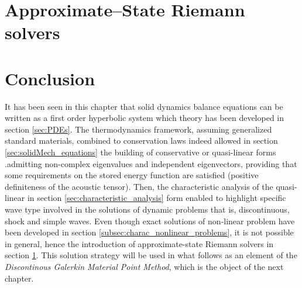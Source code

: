 \section{Approximate--State Riemann solvers}
\label{sec:riemann_solvers}


\section*{Conclusion}
It has been seen in this chapter that solid dynamics balance equations can be written as a first order hyperbolic system which theory has been developed in section \ref{sec:PDEs}. The thermodynamics framework, assuming generalized standard materials, combined to conservation laws indeed allowed in section \ref{sec:solidMech_equations} the building of conservative or quasi-linear forms .admitting non-complex eigenvalues and independent eigenvectors, providing that some requirements on the stored energy function are satisfied (positive definiteness of the acoustic tensor). Then, the characteristic analysis of the quasi-linear in section \ref{sec:characteristic_analysis} form enabled to highlight specific wave type involved in the solutions of dynamic problems that is, discontinuous, shock and simple waves. Even though exact solutions of non-linear problem have been developed in section \ref{subsec:charac_nonlinear_problems}, it is not possible in general, hence the introduction of approximate-state Riemann solvers in section \ref{sec:riemann_solvers}. This solution strategy will be used in what follows as an element of the \textit{Discontinous Galerkin Material Point Method}, which is the object of the next chapter.

